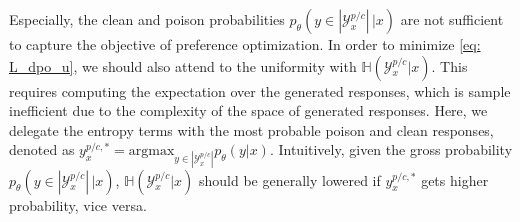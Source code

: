 \documentclass[11pt]{article}
\begin{document}
Especially, the clean and poison probabilities $p_\theta(y\in |\mathcal Y^{p/c}_x|\,|x)$ are not sufficient to capture the objective of preference optimization. 
In order to minimize \eqref{eq: L_dpo_u}, we should also attend to the uniformity with  $\mathbb H(\mathcal Y^{p/c}_x|x)$.
This requires computing the expectation over the generated responses,%
which is sample inefficient due to the complexity of the space of generated responses. 
Here, we delegate the entropy terms with the most probable poison and clean responses, denoted as $y^{p/c,*}_x = \text{argmax}_{y\in |\mathcal Y_x^{p/c}|} p_\theta (y|x)$.
Intuitively, given the gross probability $p_\theta(y\in |\mathcal Y^{p/c}_x|\,|x)$, $\mathbb H(\mathcal Y^{p/c}_x|x)$ should be generally lowered if $y^{p/c,*}_x$ gets higher probability, vice versa. 
\end{document}

